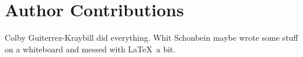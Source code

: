 \section*{Author Contributions}
Colby Guiterrez-Kraybill did everything. Whit Schonbein maybe wrote some stuff on a whiteboard and messed with \LaTeX\ a bit.


